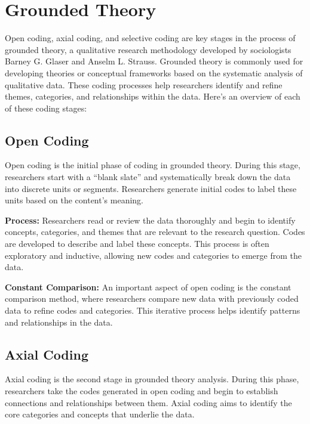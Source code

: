 \documentclass[
  b5paper]{book}
\begin{document}
\hypertarget{grounded-theory}{%
\section{Grounded Theory}\label{grounded-theory}}

Open coding, axial coding, and selective coding are key stages in the process of grounded theory, a qualitative research methodology developed by sociologists Barney G. Glaser and Anselm L. Strauss. Grounded theory is commonly used for developing theories or conceptual frameworks based on the systematic analysis of qualitative data. These coding processes help researchers identify and refine themes, categories, and relationships within the data. Here's an overview of each of these coding stages:

\hypertarget{open-coding}{%
\subsection*{Open Coding}\label{open-coding}}

Open coding is the initial phase of coding in grounded theory. During this stage, researchers start with a ``blank slate'' and systematically break down the data into discrete units or segments. Researchers generate initial codes to label these units based on the content's meaning.

\textbf{Process:} Researchers read or review the data thoroughly and begin to identify concepts, categories, and themes that are relevant to the research question. Codes are developed to describe and label these concepts. This process is often exploratory and inductive, allowing new codes and categories to emerge from the data.

\textbf{Constant Comparison:} An important aspect of open coding is the constant comparison method, where researchers compare new data with previously coded data to refine codes and categories. This iterative process helps identify patterns and relationships in the data.

\hypertarget{axial-coding}{%
\subsection*{Axial Coding}\label{axial-coding}}

Axial coding is the second stage in grounded theory analysis. During this phase, researchers take the codes generated in open coding and begin to establish connections and relationships between them. Axial coding aims to identify the core categories and concepts that underlie the data.
\end{document}
